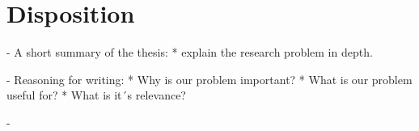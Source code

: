\section{Disposition}
 - A short summary of the thesis:
    * explain the research problem in depth.
    
 - Reasoning for writing:
    * Why is our problem important?
    * What is our problem useful for?
    * What is it´s relevance?

 - 

